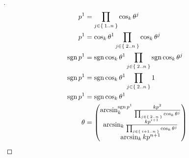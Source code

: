 \documentclass[../main.tex]{subfiles}
\begin{document}
\begin{proof}[]
\begin{align*}
        \tensor{p}{^1}                                                                     & = \prod_{j\in\Set{1..n}}{\cos_k{\tensor{\theta}{^j}}}                                                                 \\
        \tensor{p}{^1}                                                                     & = \cos_k{\tensor{\theta}{^1}}\prod_{j\in\Set{2..n}}{\cos_k{\tensor{\theta}{^j}}}                                      \\
        \sign{\tensor{p}{^1}}                                                              & = \sign{\cos_k{\tensor{\theta}{^1}}}\prod_{j\in\Set{2..n}}{\sign{\cos_k{\tensor{\theta}{^j}}}}                        \\
        \sign{\tensor{p}{^1}}                                                              & = \sign{\cos_k{\tensor{\theta}{^1}}}\prod_{j\in\Set{2..n}}{1}                                                         \\
        \sign{\tensor{p}{^1}}                                                              & = \sign{\cos_k{\tensor{\theta}{^1}}}                                                                                  \\
        \theta                                                                             & = \begin{pmatrix}
                                                                                                   \arcsin_k^{\sign{\tensor{p}{^1}}}{\frac{k\tensor{p}{^2}}{\prod_{j\in\Set{2..n}}{\cos_k{\tensor{\theta}{^j}}}}} \\
                                                                                                   \arcsin_k{\frac{k\tensor{p}{^{i+1}}}{\prod_{j\in\Set{i+1..n}}{\cos_k{\tensor{\theta}{^j}}}}}                   \\
                                                                                                   \arcsin_k{k\tensor{p}{^{n+1}}}                                                                                 \\
                                                                                               \end{pmatrix}
    \end{align*}
\end{proof}
\end{document}
